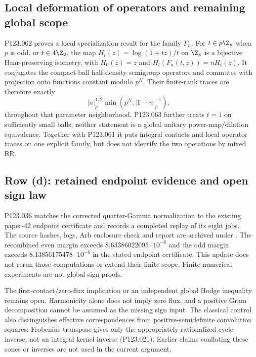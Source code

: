 \subsection{Local deformation of operators and remaining global scope}
P123.062 proves a local specialization result for the family $F_n$.
For $t\in p\Z_p$ when $p$ is odd, or $t\in4\Z_2$, the map
$H_t(z)=\log(1+tz)/t$ on $\Z_p$ is a bijective Haar-preserving isometry,
with $H_0(z)=z$ and $H_t(F_n(t,z))=nH_t(z)$.
It conjugates the compact-ball half-density semigroup operators and
commutes with projection onto functions constant modulo $p^N$. Their
finite-rank traces are therefore exactly
\[
 |n|_p^{1/2}\min(p^N,|1-n|_p^{-1}),
\]
throughout that parameter neighborhood. P123.063 further treats $t=1$
on sufficiently small balls; neither statement is a global unitary
power-map/dilation equivalence. Together with P123.061
it puts integral contacts and local operator traces on one explicit
family, but does not identify the two operations by mixed RR.

\subsection{Row (d): retained endpoint evidence and open sign law}
P123.036 matches the corrected quarter-Gamma normalization to the existing
paper-42 endpoint certificate and records a completed replay of its eight
jobs. The source hashes, logs, Arb enclosure check and report are archived
under .
The recombined even margin exceeds $8.63386022095\cdot10^{-8}$ and the
odd margin exceeds $8.13856175478\cdot10^{-6}$ in the stated endpoint
certificate. This update does not rerun those computations or extend
their finite scope. Finite numerical experiments are not global sign proofs.

The first-contact/zero-flux implication or an independent global Hodge
inequality remains open. Harmonicity alone does not imply zero flux,
and a positive Gram decomposition cannot be assumed as the missing sign
input. The classical control also distinguishes effective correspondences
from positive-semidefinite convolution squares; Frobenius transpose gives
only the appropriately rationalized cycle inverse, not an integral kernel
inverse (P123.021). Earlier claims conflating these cones or inverses are
not used in the current argument.



